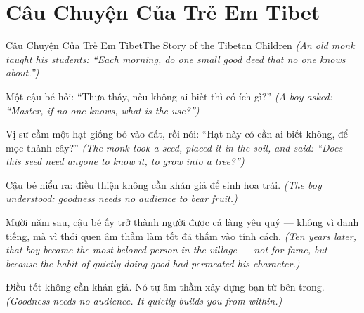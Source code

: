 \section{Câu Chuyện Của Trẻ Em Tibet}
\begin{truyen}{Câu Chuyện Của Trẻ Em Tibet}{The Story of the Tibetan Children}
\textit{(An old monk taught his students: ``Each morning, do one small good deed that no one knows about.'')}

Một cậu bé hỏi: ``Thưa thầy, nếu không ai biết thì có ích gì?''
\textit{(A boy asked: ``Master, if no one knows, what is the use?'')}

Vị sư cầm một hạt giống bỏ vào đất, rồi nói: ``Hạt này có cần ai biết không, để mọc thành cây?''
\textit{(The monk took a seed, placed it in the soil, and said: ``Does this seed need anyone to know it, to grow into a tree?'')}

Cậu bé hiểu ra: điều thiện không cần khán giả để sinh hoa trái.
\textit{(The boy understood: goodness needs no audience to bear fruit.)}

Mười năm sau, cậu bé ấy trở thành người được cả làng yêu quý — không vì danh tiếng, mà vì thói quen âm thầm làm tốt đã thấm vào tính cách.
\textit{(Ten years later, that boy became the most beloved person in the village — not for fame, but because the habit of quietly doing good had permeated his character.)}

\end{truyen}

\begin{baihoc}
Điều tốt không cần khán giả. Nó tự âm thầm xây dựng bạn từ bên trong.
\textit{(Goodness needs no audience. It quietly builds you from within.)}
\end{baihoc}
\ngancach

